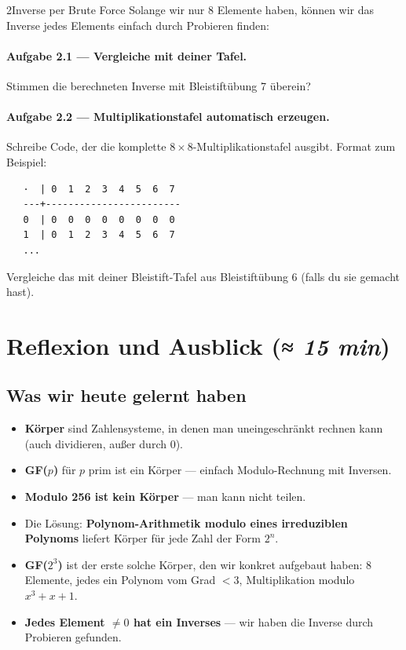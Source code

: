 \begin{pythoneinheit}{2}{Inverse per Brute Force}
Solange wir nur 8 Elemente haben, können wir das Inverse jedes
Elements einfach durch Probieren finden:


\paragraph{Aufgabe 2.1 — Vergleiche mit deiner Tafel.}
Stimmen die berechneten Inverse mit Bleistiftübung 7 überein?

\paragraph{Aufgabe 2.2 — Multiplikationstafel automatisch erzeugen.}
Schreibe Code, der die komplette $8 \times 8$-Multiplikationstafel
ausgibt. Format zum Beispiel:

\begin{verbatim}
   ·  | 0  1  2  3  4  5  6  7
   ---+------------------------
   0  | 0  0  0  0  0  0  0  0
   1  | 0  1  2  3  4  5  6  7
   ...
\end{verbatim}

Vergleiche das mit deiner Bleistift-Tafel aus Bleistiftübung 6
(falls du sie gemacht hast).
\end{pythoneinheit}

\section{Reflexion und Ausblick \normalfont(\textit{≈ 15 min})}

\subsection*{Was wir heute gelernt haben}

\begin{itemize}
\item \textbf{Körper} sind Zahlensysteme, in denen man uneingeschränkt
  rechnen kann (auch dividieren, außer durch 0).
\item \textbf{GF($p$)} für $p$ prim ist ein Körper — einfach
  Modulo-Rechnung mit Inversen.
\item \textbf{Modulo 256 ist kein Körper} — man kann nicht teilen.
\item Die Lösung: \textbf{Polynom-Arithmetik modulo eines
  irreduziblen Polynoms} liefert Körper für jede Zahl der Form
  $2^n$.
\item \textbf{GF($2^3$)} ist der erste solche Körper, den wir konkret
  aufgebaut haben: 8 Elemente, jedes ein Polynom vom Grad $< 3$,
  Multiplikation modulo $x^3 + x + 1$.
\item \textbf{Jedes Element $\ne 0$ hat ein Inverses} — wir haben die
  Inverse durch Probieren gefunden.
\end{itemize}

